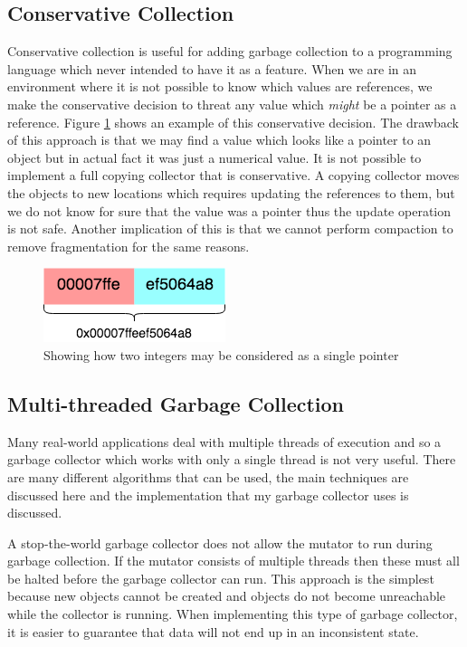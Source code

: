 \documentclass[../diss.tex]{subfiles}
\begin{document}
\subsection{Conservative Collection} \label{lab:conservative}

Conservative collection\cite{conservative} is useful for adding garbage collection to a programming language which never intended to have it as a feature. When we are in an environment where it is not possible to know which values are references, we make the conservative decision to threat any value which \emph{might} be a pointer as a reference. Figure \ref{fig:conservative} shows an example of this conservative decision. The drawback of this approach is that we may find a value which looks like a pointer to an object but in actual fact it was just a numerical value. It is not possible to implement a full copying collector that is conservative. A copying collector moves the objects to new locations which requires updating the references to them, but we do not know for sure that the value was a pointer thus the update operation is not safe. Another implication of this is that we cannot perform compaction to remove fragmentation for the same reasons.

\begin{figure}
    \centering
    \includegraphics{figs/conservative.png}
    \caption{Showing how two integers may be considered as a single pointer}
    \label{fig:conservative}
\end{figure}

\subsection{Multi-threaded Garbage Collection} \label{sec:multithreadingmodels}

Many real-world applications deal with multiple threads of execution and so a garbage collector which works with only a single thread is not very useful. There are many different algorithms that can be used, the main techniques are discussed here and the implementation that my garbage collector uses is discussed.

A stop-the-world garbage collector does not allow the mutator to run during garbage collection. If the mutator consists of multiple threads then these must all be halted before the garbage collector can run. This approach is the simplest because new objects cannot be created and objects do not become unreachable while the collector is running. When implementing this type of garbage collector, it is easier to guarantee that data will not end up in an inconsistent state.
\end{document}
